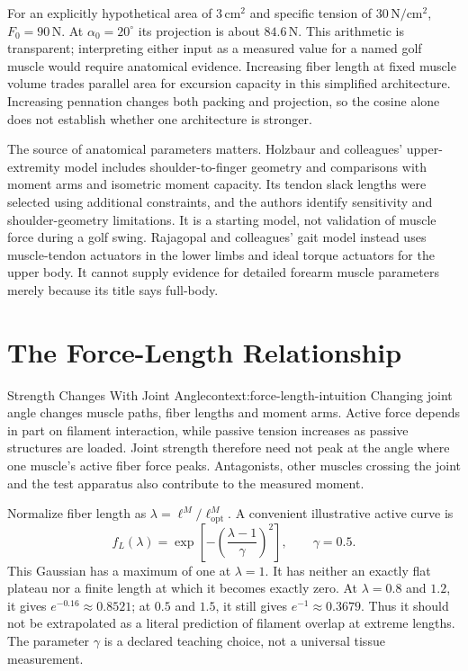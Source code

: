 For an explicitly hypothetical area of $3\,\mathrm{cm^2}$ and specific tension of $30\,\mathrm{N/cm^2}$, $F_0=90\,\mathrm{N}$. At $\alpha_0=20^\circ$ its projection is about $84.6\,\mathrm{N}$. This arithmetic is transparent; interpreting either input as a measured value for a named golf muscle would require anatomical evidence. Increasing fiber length at fixed muscle volume trades parallel area for excursion capacity in this simplified architecture. Increasing pennation changes both packing and projection, so the cosine alone does not establish whether one architecture is stronger.

The source of anatomical parameters matters. Holzbaur and colleagues' upper-extremity model includes shoulder-to-finger geometry and comparisons with moment arms and isometric moment capacity. Its tendon slack lengths were selected using additional constraints, and the authors identify sensitivity and shoulder-geometry limitations. It is a starting model, not validation of muscle force during a golf swing. \citep{Holzbaur2005} Rajagopal and colleagues' gait model instead uses muscle-tendon actuators in the lower limbs and ideal torque actuators for the upper body. It cannot supply evidence for detailed forearm muscle parameters merely because its title says full-body. \citep{Rajagopal2016}

\section{The Force-Length Relationship}

\begin{laymansbox}{Strength Changes With Joint Angle}{context:force-length-intuition}
Changing joint angle changes muscle paths, fiber lengths and moment arms. Active force depends in part on filament interaction, while passive tension increases as passive structures are loaded. Joint strength therefore need not peak at the angle where one muscle's active fiber force peaks. Antagonists, other muscles crossing the joint and the test apparatus also contribute to the measured moment.
\end{laymansbox}

Normalize fiber length as $\lambda=\ell^M/\ell^M_{\mathrm{opt}}$. A convenient illustrative active curve is
\begin{equation}
f_L(\lambda)=\exp\!\left[-\left(\frac{\lambda-1}{\gamma}\right)^2\right],
\qquad \gamma=0.5.
\label{eq:active-force-length}
\end{equation}
This Gaussian has a maximum of one at $\lambda=1$. It has neither an exactly flat plateau nor a finite length at which it becomes exactly zero. At $\lambda=0.8$ and $1.2$, it gives $e^{-0.16}\approx0.8521$; at $0.5$ and $1.5$, it still gives $e^{-1}\approx0.3679$. Thus it should not be extrapolated as a literal prediction of filament overlap at extreme lengths. The parameter $\gamma$ is a declared teaching choice, not a universal tissue measurement.

